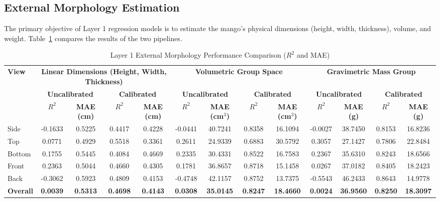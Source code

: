 \subsection{External Morphology Estimation}
The primary objective of Layer 1 regression models is to estimate the mango's physical
dimensions (height, width, thickness), volume, and weight. Table~\ref{tab:external_morphology}
compares the results of the two pipelines.

\begin{table}[htbp]
\caption{Layer 1 External Morphology Performance Comparison ($R^2$ and MAE)}
\begin{center}
\begin{tabular}{|l|c|c|c|c|c|c|c|c|c|c|c|c|}
\hline
\textbf{View} & \multicolumn{4}{c|}{\textbf{Linear Dimensions (Height, Width, Thickness)}} & \multicolumn{4}{c|}{\textbf{Volumetric Group Space}} & \multicolumn{4}{c|}{\textbf{Gravimetric Mass Group}} \\
\cline{2-13}
 & \multicolumn{2}{c|}{\textbf{Uncalibrated}} & \multicolumn{2}{c|}{\textbf{Calibrated}} & \multicolumn{2}{c|}{\textbf{Uncalibrated}} & \multicolumn{2}{c|}{\textbf{Calibrated}} & \multicolumn{2}{c|}{\textbf{Uncalibrated}} & \multicolumn{2}{c|}{\textbf{Calibrated}} \\
\cline{2-13}
 & \textbf{$R^2$} & \textbf{MAE (cm)} & \textbf{$R^2$} & \textbf{MAE (cm)} & \textbf{$R^2$} & \textbf{MAE (cm$^3$)} & \textbf{$R^2$} & \textbf{MAE (cm$^3$)} & \textbf{$R^2$} & \textbf{MAE (g)} & \textbf{$R^2$} & \textbf{MAE (g)} \\
\hline
Side   & -0.1633 & 0.5225 & 0.4417 & 0.4228 & -0.0441 & 40.7241 & 0.8358 & 16.1094 & -0.0027 & 38.7450 & 0.8153 & 16.8236 \\
Top    &  0.0771 & 0.4929 & 0.5518 & 0.3361 &  0.2611 & 24.9339 & 0.6883 & 30.5792 &  0.3057 & 27.1427 & 0.7806 & 22.8484 \\
Bottom &  0.1755 & 0.5445 & 0.4084 & 0.4669 &  0.2335 & 30.4331 & 0.8522 & 16.7583 &  0.2367 & 35.6310 & 0.8243 & 18.6566 \\
Front  &  0.2363 & 0.5044 & 0.4660 & 0.4305 &  0.1781 & 36.8657 & 0.8718 & 15.1458 &  0.0267 & 37.0182 & 0.8405 & 18.2423 \\
Back   & -0.3062 & 0.5923 & 0.4809 & 0.4153 & -0.4748 & 42.1157 & 0.8752 & 13.7375 & -0.5543 & 46.2433 & 0.8643 & 14.9778 \\
\hline
\textbf{Overall} & \textbf{0.0039} & \textbf{0.5313} & \textbf{0.4698} & \textbf{0.4143} & \textbf{0.0308} & \textbf{35.0145} & \textbf{0.8247} & \textbf{18.4660} & \textbf{0.0024} & \textbf{36.9560} & \textbf{0.8250} & \textbf{18.3097} \\
\hline
\end{tabular}
\label{tab:external_morphology}
\end{center}
\end{table}

